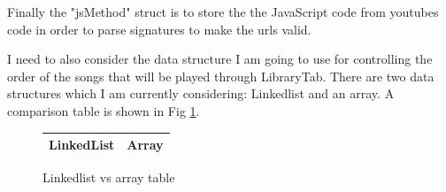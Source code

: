 \documentclass{article}
\begin{document}
Finally the "jsMethod" struct is to store the the JavaScript code from youtubes code in
order to parse signatures to make the urls valid.

I need to also consider the data structure I am going to use for controlling the order of
the songs that will be played through LibraryTab. There are two data structures which
I am currently considering: Linkedlist and an array. A comparison table is shown in
Fig \ref{fig:Data structure table}.


\begin{figure}[h]
    \begin{center}
	\begin{tabular}{c | c}
	    LinkedList & Array \\ \hline
	    
    	\end{tabular}
    \end{center}
    \caption{Linkedlist vs array table} \label{fig:Data structure table}
\end{figure}
\end{document}

